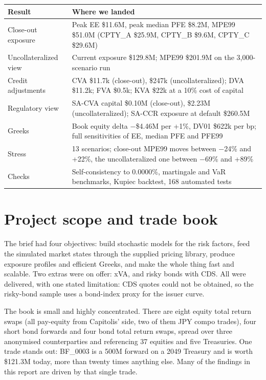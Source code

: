\documentclass[11pt,letterpaper]{article}
\begin{document}
\begin{center}
\small
\begin{tabular}{@{}p{5.2cm}p{9.6cm}@{}}
\toprule
\textbf{Result} & \textbf{Where we landed}\\
\midrule
Close-out exposure & Peak EE \$11.6M, peak median PFE \$8.2M, MPE99 \$51.0M (CPTY\_A \$25.9M, CPTY\_B \$9.6M, CPTY\_C \$29.6M)\\
Uncollateralized view & Current exposure \$129.8M; MPE99 \$201.9M on the 3,000-scenario run\\
Credit adjustments & CVA \$11.7k (close-out), \$247k (uncollateralized); DVA \$11.2k; FVA \$0.5k; KVA \$22k at a 10\% cost of capital\\
Regulatory view & SA-CVA capital \$0.10M (close-out), \$2.23M (uncollateralized); SA-CCR exposure at default \$260.5M\\
Greeks & Book equity delta $-$\$4.46M per +1\%, DV01 \$622k per bp; full sensitivities of EE, median PFE and PFE99\\
Stress & 13 scenarios; close-out MPE99 moves between $-$24\% and +22\%, the uncollateralized one between $-$69\% and +89\%\\
Checks & Self-consistency to 0.0000\%, martingale and VaR benchmarks, Kupiec backtest, 168 automated tests\\
\bottomrule
\end{tabular}
\end{center}

\section{Project scope and trade book}

The brief had four objectives: build stochastic models for the risk factors, feed the simulated market states through the supplied pricing library, produce exposure profiles and efficient Greeks, and make the whole thing fast and scalable. Two extras were on offer: xVA, and risky bonds with CDS. All were delivered, with one stated limitation: CDS quotes could not be obtained, so the risky-bond sample uses a bond-index proxy for the issuer curve.

The book is small and highly concentrated. There are eight equity total return swaps (all pay-equity from Capitolis' side, two of them JPY compo trades), four short bond forwards and four bond total return swaps, spread over three anonymised counterparties and referencing 37 equities and five Treasuries. One trade stands out: BF\_0003 is a 500M forward on a 2049 Treasury and is worth \$121.3M today, more than twenty times anything else. Many of the findings in this report are driven by that single trade.
\end{document}
